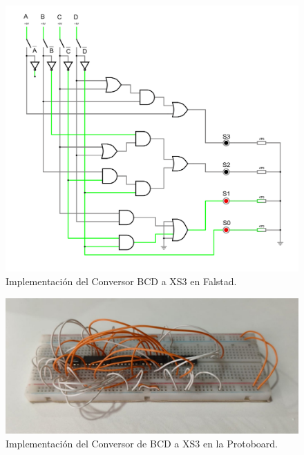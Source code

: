\documentclass[]{informeutn}
\begin{document}
    \begin{figure}[!ht]
      \centering
      \includegraphics[width=.8\textwidth]{images/ej1.png}
      \caption{Implementación del Conversor BCD a XS3 en Falstad.}
      \label{falstad.ej1}
    \end{figure}

    \begin{figure}[!ht]
      \centering
      \includegraphics[width=.8\textwidth]{pictures/prot-ej1.jpeg}
      \caption{Implementación del Conversor de BCD a XS3 en la Protoboard.}
      \label{crkt.ej1.prot}
    \end{figure}

    
\end{document}
